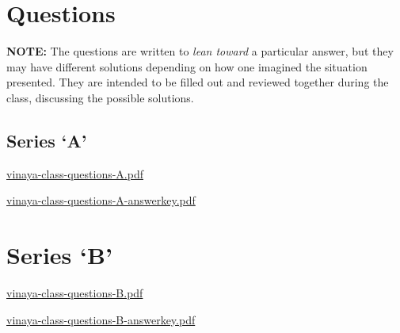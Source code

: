 \chapter{Questions}

\textbf{NOTE:} The questions are written to \emph{lean toward} a
particular answer, but they may have different solutions depending on
how one imagined the situation presented. They are intended to be filled
out and reviewed together during the class, discussing the possible
solutions.

\section{Series `A'}

\href{./includes/docs/vinaya-class-questions-A.pdf}{vinaya-class-questions-A.pdf}

\href{./includes/docs/vinaya-class-questions-A-answerkey.pdf}{vinaya-class-questions-A-answerkey.pdf}

\chapter{Series `B'}

\href{./includes/docs/vinaya-class-questions-B.pdf}{vinaya-class-questions-B.pdf}

\href{./includes/docs/vinaya-class-questions-B-answerkey.pdf}{vinaya-class-questions-B-answerkey.pdf}

